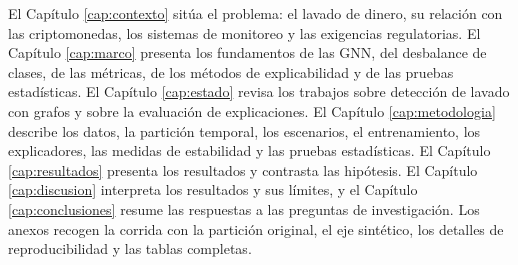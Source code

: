 El Capítulo \ref{cap:contexto} sitúa el problema: el lavado de dinero, su
relación con las criptomonedas, los sistemas de monitoreo y las exigencias regulatorias. El
Capítulo \ref{cap:marco} presenta los fundamentos de las GNN, del desbalance de clases, de las
métricas, de los métodos de explicabilidad y de las pruebas estadísticas. El Capítulo \ref{cap:estado} revisa los trabajos sobre
detección de lavado con grafos y sobre la evaluación de explicaciones. El Capítulo
\ref{cap:metodologia} describe los datos, la partición temporal, los escenarios, el
entrenamiento, los explicadores, las medidas de estabilidad y las pruebas estadísticas. El
Capítulo \ref{cap:resultados} presenta los resultados y contrasta las hipótesis. El Capítulo
\ref{cap:discusion} interpreta los resultados y sus límites, y el Capítulo
\ref{cap:conclusiones} resume las respuestas a las preguntas de investigación. Los anexos
recogen la corrida con la partición original, el eje sintético, los detalles de
reproducibilidad y las tablas completas.
